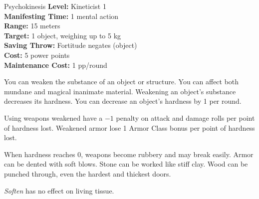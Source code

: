 {Psychokinesis}
{
	\textbf{Level:}
	Kineticist 1\\
	\textbf{Manifesting Time:}
	1 mental action\\
	\textbf{Range:}
	15 meters\\
	\textbf{Target:}
	1 object, weighing up to 5 kg\\
	\textbf{Saving Throw:}
	Fortitude negates (object)\\
	\textbf{Cost:}
	5 power points\\
	\textbf{Maintenance Cost:}
	1 pp/round\\
}
{
	You can weaken the substance of an object or structure. You can affect both mundane and magical inanimate material. Weakening an object's substance decreases its hardness. You can decrease an object's hardness by 1 per round.

	Using weapons weakened have a $-1$ penalty on attack and damage rolls per point of hardness lost. Weakened armor lose 1 Armor Class bonus per point of hardness lost.

	When hardness reaches 0, weapons become rubbery and may break easily. Armor can be dented with soft blows. Stone can be worked like stiff clay. Wood can be punched through, even the hardest and thickest doors.

	\emph{Soften} has no effect on living tissue.
}
